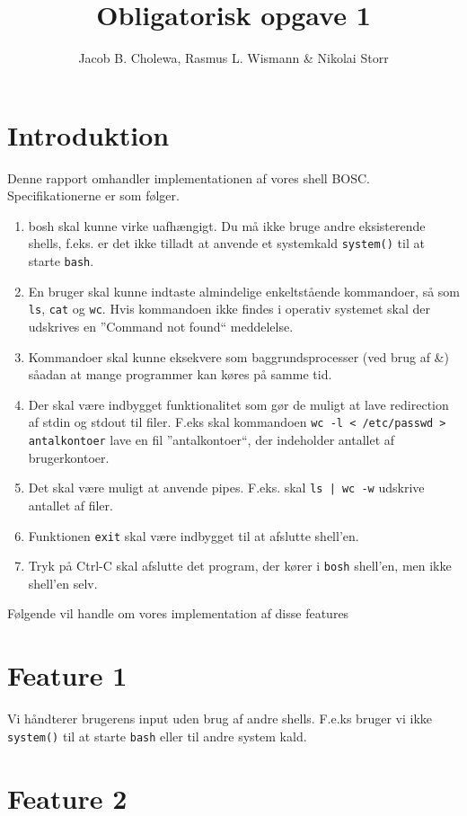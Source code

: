 \documentclass[danish]{report}
\title{Obligatorisk opgave 1}
\author{Jacob B. Cholewa, Rasmus L. Wismann \& Nikolai Storr }
\begin{document}
\maketitle


\section{Introduktion}
Denne rapport omhandler implementationen af vores shell BOSC. Specifikationerne er som følger.

\begin{enumerate}
\item bosh skal kunne virke uafhængigt. Du må ikke bruge andre eksisterende shells, f.eks. er det ikke tilladt at anvende et systemkald {\tt system()} til at starte {\tt bash}.
\item En bruger skal kunne indtaste almindelige enkeltstående kommandoer, så som {\tt ls}, {\tt cat} og {\tt wc}. Hvis kommandoen ikke findes i operativ systemet skal der udskrives en ”Command not found“ meddelelse.
\item Kommandoer skal kunne eksekvere som baggrundsprocesser (ved brug af \&) såadan at mange programmer kan køres på samme tid.
\item Der skal være indbygget funktionalitet som gør de muligt at lave redirection af stdin og stdout til filer. F.eks skal kommandoen {\tt wc -l < /etc/passwd > antalkontoer} lave en fil ”antalkontoer“, der indeholder antallet af brugerkontoer.
\item Det skal være muligt at anvende pipes. F.eks. skal {\tt ls | wc -w} udskrive antallet af filer.
\item Funktionen {\tt exit} skal være indbygget til at afslutte shell’en.
\item Tryk på Ctrl-C skal afslutte det program, der kører i {\tt bosh} shell’en, men ikke shell’en selv.
\end{enumerate}

Følgende vil handle om vores implementation af disse features 

\section{Feature 1}

Vi håndterer brugerens input uden brug af andre shells. F.e.ks bruger vi ikke {\tt system()} til at starte {\tt bash} eller til andre system kald. 


\section{Feature 2}
\end{document}
